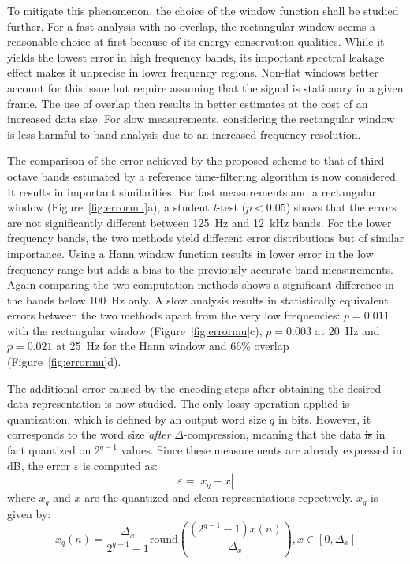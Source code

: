 \documentclass[sensors,article,accept,moreauthors,pdftex,10pt,a4paper]{mdpi}
\providecommand{\DIFaddtex}[1]{{\protect\color{blue}\uwave{#1}}} %
\providecommand{\DIFdeltex}[1]{{\protect\color{red}\sout{#1}}}                      %
\providecommand{\DIFaddbegin}{} %
\providecommand{\DIFaddend}{} %
\providecommand{\DIFdelbegin}{} %
\providecommand{\DIFdelend}{} %
\providecommand{\DIFadd}[1]{\texorpdfstring{\DIFaddtex{#1}}{#1}} %
\providecommand{\DIFdel}[1]{\texorpdfstring{\DIFdeltex{#1}}{}} %
\begin{document}
To mitigate this phenomenon, the choice of the window function shall be studied further. For a fast analysis with no overlap, the rectangular window seems a reasonable choice at first because of its energy conservation qualities. While it yields the lowest error in high frequency bands, its important spectral leakage effect makes it unprecise in lower frequency regions. Non-flat windows better account for this issue but require assuming that the signal is stationary in a given frame. The use of overlap then results in better estimates at the cost of an increased data size. For slow measurements, considering the rectangular window is less harmful to band analysis due to an increased frequency resolution.

The comparison of the error achieved by the proposed scheme to that of third-octave bands estimated by a reference time-filtering algorithm is now considered. It results in important similarities. For fast measurements and a rectangular window (Figure~\ref{fig:errormu}a), a student \emph{t}-test ($p<0.05$) shows that the errors are not significantly different between 125~Hz and 12~kHz bands. For the lower frequency bands, the two methods yield different error distributions but of similar importance. Using a Hann window function results in lower error in the low frequency range but adds a bias to the previously accurate band measurements. Again comparing the two computation methods shows a significant difference in the bands below 100~Hz only. A slow analysis results in statistically equivalent errors between the two methods apart from the very low frequencies: $p = 0.011$ with the rectangular window (Figure~\ref{fig:errormu}c), $p = 0.003$ at 20~Hz and $p = 0.021$ at 25~Hz for the Hann window and 66\% overlap (Figure~\ref{fig:errormu}d).

The additional error caused by the encoding steps after obtaining the desired data representation is now studied. The only lossy operation applied is quantization, which is defined by an output word size $q$ in bits. However, it corresponds to the word size \textit{after} $\Delta$-compression, meaning that the data \DIFdelbegin \DIFdel{is }\DIFdelend \DIFaddbegin {\DIFadd{are}} \DIFaddend in fact quantized on $2^{q-1}$ values. Since these measurements are already expressed in dB, the error $\varepsilon$ is computed as:
\begin{equation*}
	\varepsilon = |x_q-x|
\end{equation*}
where $x_q$ and $x$ are the quantized and clean representations repectively. $x_q$ is given by:
\begin{equation*}
x_q(n) = \frac{\Delta_x}{2^{q-1}-1}\textrm{round}\left(\frac{(2^{q-1}-1)x(n)}{\Delta_x}\right), x\in \left[0, \Delta_x\right]
\end{equation*}
\end{document}
